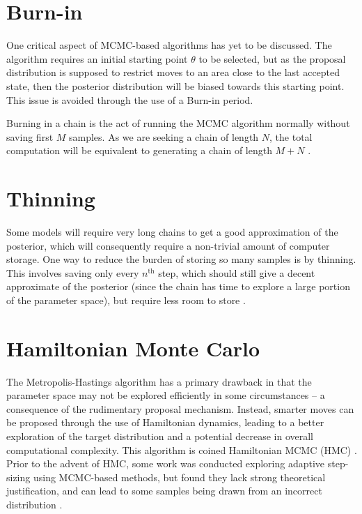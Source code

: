 \section{Burn-in}

    One critical aspect of MCMC-based algorithms has yet to be discussed. The algorithm requires an initial starting point $\theta$ to be selected, but as the proposal distribution is supposed to restrict moves to an area close to the last accepted state, then the posterior distribution will be biased towards this starting point. This issue is avoided through the use of a Burn-in period.

    Burning in a chain is the act of running the MCMC algorithm normally without saving first $M$ samples. As we are seeking a chain of length $N$, the total computation will be equivalent to generating a chain of length $M+N$ \cite{Andrieu2003}.


\section{Thinning}

    Some models will require very long chains to get a good approximation of the posterior, which will consequently require a non-trivial amount of computer storage. One way to reduce the burden of storing so many samples is by thinning. This involves saving only every $n^{\text{th}}$ step, which should still give a decent approximate of the posterior (since the chain has time to explore a large portion of the parameter space), but require less room to store \cite{Link2012}.


\section{Hamiltonian Monte Carlo}

    The Metropolis-Hastings algorithm has a primary drawback in that the parameter space may not be explored efficiently in some circumstances -- a consequence of the rudimentary proposal mechanism. Instead, smarter moves can be proposed through the use of Hamiltonian dynamics, leading to a better exploration of the target distribution and a potential decrease in overall computational complexity. This algorithm is coined Hamiltonian MCMC (HMC) \cite{Neal2011}. Prior to the advent of HMC, some work was conducted exploring adaptive step-sizing using MCMC-based methods, but found they lack strong theoretical justification, and can lead to some samples being drawn from an incorrect distribution \cite{Neal2011}.

